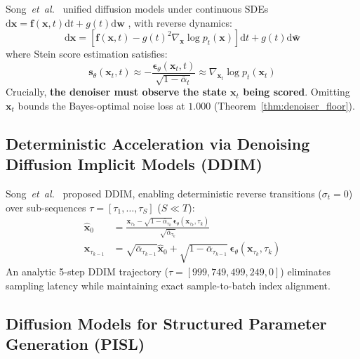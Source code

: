 Song~\textit{et~al.}~\cite{song2020score} unified diffusion models under continuous SDEs $\mathrm{d}\mathbf{x} = \mathbf{f}(\mathbf{x}, t)\mathrm{d}t + g(t)\mathrm{d}\mathbf{w}$ \label{eq:lit_forward_sde}, with reverse dynamics:
\begin{equation}
\label{eq:lit_reverse_sde}
\mathrm{d}\mathbf{x} = \left[\mathbf{f}(\mathbf{x}, t) - g(t)^2 \nabla_{\mathbf{x}} \log p_t(\mathbf{x})\right]\mathrm{d}t + g(t)\mathrm{d}\bar{\mathbf{w}}
\end{equation}
where Stein score estimation satisfies:
\begin{equation}
\label{eq:lit_score_relation}
\mathbf{s}_\theta(\mathbf{x}_t, t) \approx -\frac{\boldsymbol{\epsilon}_\theta(\mathbf{x}_t, t)}{\sqrt{1 - \bar{\alpha}_t}} \approx \nabla_{\mathbf{x}_t} \log p_t(\mathbf{x}_t)
\end{equation}
Crucially, \textbf{the denoiser must observe the state $\mathbf{x}_t$ being scored}. Omitting $\mathbf{x}_t$ bounds the Bayes-optimal noise loss at $1.000$ (Theorem~\ref{thm:denoiser_floor}).

\subsection{Deterministic Acceleration via Denoising Diffusion Implicit Models (DDIM)}
\label{subsec:ddim_theory}

Song~\textit{et~al.}~\cite{song2020denoising} proposed DDIM, enabling deterministic reverse transitions ($\sigma_t = 0$) over sub-sequences $\tau = [\tau_1, \dots, \tau_S]$ ($S \ll T$):
\begin{align}
\label{eq:lit_ddim_x0}
\hat{\mathbf{x}}_0 &= \frac{\mathbf{x}_{\tau_k} - \sqrt{1 - \bar{\alpha}_{\tau_k}} \, \boldsymbol{\epsilon}_\theta(\mathbf{x}_{\tau_k}, \tau_k)}{\sqrt{\bar{\alpha}_{\tau_k}}} \\
\label{eq:lit_ddim_step}
\mathbf{x}_{\tau_{k-1}} &= \sqrt{\bar{\alpha}_{\tau_{k-1}}}\hat{\mathbf{x}}_0 + \sqrt{1 - \bar{\alpha}_{\tau_{k-1}}} \, \boldsymbol{\epsilon}_\theta(\mathbf{x}_{\tau_k}, \tau_k)
\end{align}
An analytic 5-step DDIM trajectory ($\tau = [999, 749, 499, 249, 0]$) eliminates sampling latency while maintaining exact sample-to-batch index alignment.

\subsection{Diffusion Models for Structured Parameter Generation (PISL)}
\label{subsec:pisl_diffusion_lit}

